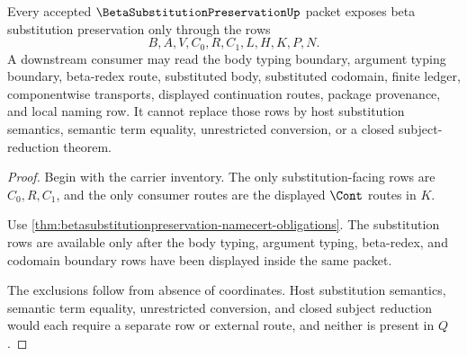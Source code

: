 \begin{theorem}
\label{thm:betasubstitutionpreservation-nonescape}
Every accepted $\BetaSubstitutionPreservationUp$ packet exposes beta substitution preservation only through the rows
$$
B,A,V,C_0,R,C_1,L,H,K,P,N.
$$
A downstream consumer may read the body typing boundary, argument typing boundary, beta-redex route, substituted body, substituted codomain, finite ledger, componentwise transports, displayed continuation routes, package provenance, and local naming row. It cannot replace those rows by host substitution semantics, semantic term equality, unrestricted conversion, or a closed subject-reduction theorem.
\end{theorem}
\begin{proof}
Begin with the carrier inventory. The only substitution-facing rows are $C_0,R,C_1$, and the only consumer routes are the displayed $\Cont$ routes in $K$.

Use \autoref{thm:betasubstitutionpreservation-namecert-obligations}. The substitution rows are available only after the body typing, argument typing, beta-redex, and codomain boundary rows have been displayed inside the same packet.

The exclusions follow from absence of coordinates. Host substitution semantics, semantic term equality, unrestricted conversion, and closed subject reduction would each require a separate row or external route, and neither is present in $Q$.
\end{proof}

